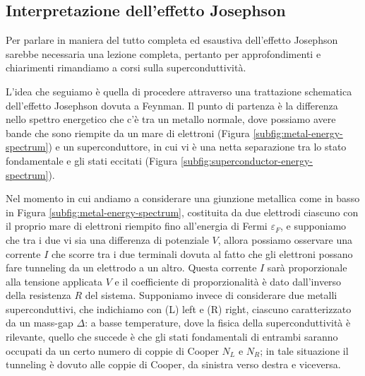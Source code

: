 \subsection{Interpretazione dell'effetto Josephson}
Per parlare in maniera del tutto completa ed esaustiva dell'effetto Josephson sarebbe necessaria una lezione completa, pertanto per approfondimenti e chiarimenti rimandiamo a corsi sulla superconduttività. 

\noindent L'idea che seguiamo è quella di procedere attraverso una trattazione schematica dell'effetto Josephson dovuta a Feynman. Il punto di partenza è la differenza nello spettro energetico che c'è tra un metallo normale, dove possiamo avere bande che sono riempite da un mare di elettroni (Figura \ref{subfig:metal-energy-spectrum}) e un superconduttore, in cui vi è una netta separazione tra lo stato fondamentale e gli stati eccitati (Figura \ref{subfig:superconductor-energy-spectrum}). 

\noindent Nel momento in cui andiamo a considerare una giunzione metallica come in basso in Figura \ref{subfig:metal-energy-spectrum}, costituita da due elettrodi ciascuno con il proprio mare di elettroni riempito fino all'energia di Fermi $\varepsilon_F$, e supponiamo che tra i due vi sia una differenza di potenziale $V$, allora possiamo osservare una corrente $I$ che scorre tra i due terminali dovuta al fatto che gli elettroni possano fare tunneling da un elettrodo a un altro. Questa corrente $I$ sarà proporzionale alla tensione applicata $V$ e il coefficiente di proporzionalità è dato dall'inverso della resistenza $R$ del sistema. Supponiamo invece di considerare due metalli superconduttivi, che indichiamo con (L) left e (R) right, ciascuno caratterizzato da un mass-gap $\Delta$: a basse temperature, dove la fisica della superconduttività è rilevante, quello che succede è che gli stati fondamentali di entrambi saranno occupati da un certo numero di coppie di Cooper $N_L$ e $N_R$; in tale situazione il tunneling è dovuto alle coppie di Cooper, da sinistra verso destra e viceversa.


